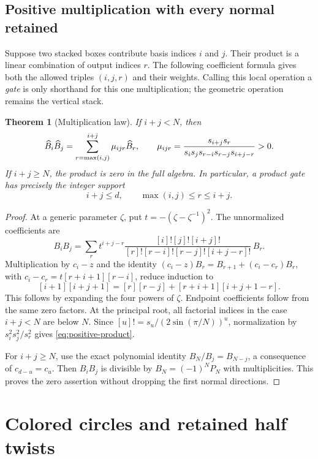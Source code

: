 \documentclass[11pt]{article}
\numberwithin{equation}{section}
\newtheorem{theorem}{Theorem}[section]
\theoremstyle{definition}\newtheorem{definition}[theorem]{Definition}
\theoremstyle{remark}\newtheorem{remark}[theorem]{Remark}
\begin{document}
\subsection{Positive multiplication with every normal retained}

Suppose two stacked boxes contribute basis indices $i$ and $j$. Their product is a linear combination of output indices $r$. The following coefficient formula gives both the allowed triples $(i,j,r)$ and their weights. Calling this local operation a \emph{gate} is only shorthand for this one multiplication; the geometric operation remains the vertical stack.
\begin{theorem}[Multiplication law]\label{thm:positive-product}
If $i+j<N$, then
\begin{equation}\label{eq:positive-product}
 \widehat B_i\widehat B_j=\sum_{r=\max(i,j)}^{i+j}\mu_{ijr}\widehat B_r,
 \qquad
 \mu_{ijr}=\frac{s_{i+j}s_r}
 {s_i s_j s_{r-i}s_{r-j}s_{i+j-r}}>0.
\end{equation}
If $i+j\ge N$, the product is zero in the full algebra. In particular, a product gate has precisely the integer support
\begin{equation}\label{eq:gate-support}
 i+j\le d,\qquad \max(i,j)\le r\le i+j.
\end{equation}
\end{theorem}
\begin{proof}
At a generic parameter $\zeta$, put $t=-(\zeta-\zeta^{-1})^2$. The unnormalized coefficients are
\[
 B_iB_j=\sum_r
 t^{i+j-r}\frac{[i]![j]![i+j]!}
 {[r]![r-i]![r-j]![i+j-r]!}\,B_r.
\]
Multiplication by $c_i-z$ and the identity
$(c_i-z)B_r=B_{r+1}+(c_i-c_r)B_r$, with
$c_i-c_r=t[r+i+1][r-i]$, reduce induction to
\[
 [i+1][i+j+1]=[r][r-j]+[r+i+1][i+j+1-r].
\]
This follows by expanding the four powers of $\zeta$. Endpoint coefficients follow from the same zero factors. At the principal root, all factorial indices in the case $i+j<N$ are below $N$. Since $[u]!=s_u/(2\sin(\pi/N))^u$, normalization by $s_i^2s_j^2/s_r^2$ gives \eqref{eq:positive-product}.

For $i+j\ge N$, use the exact polynomial identity $B_N/B_j=B_{N-j}$, a consequence of $c_{d-u}=c_u$. Then $B_iB_j$ is divisible by $B_N=(-1)^NP_N$ with multiplicities. This proves the zero assertion without dropping the first normal directions.
\end{proof}

\section{Colored circles and retained half twists}\label{nt:colors}
\end{document}
